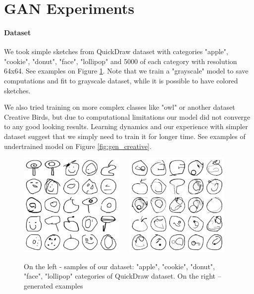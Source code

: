 \documentclass{article}
\begin{document}
\section{GAN Experiments}
	\paragraph{Dataset}
	We took simple sketches from QuickDraw dataset with categories "apple", "cookie", "donut", "face", "lollipop" and 5000 of each category with resolution 64x64. See examples on Figure \ref{fig:dataset}. Note that we train a "grayscale" model to save computations and fit to grayscale dataset, while it is possible to have colored sketches.
	
	We also tried training on more complex classes like "owl" or another dataset Creative Birds, but due to computational limitations our model did not converge to any good looking results. Learning dynamics and our experience with simpler dataset suggest that we simply need to train it for longer time. See examples of undertrained model on Figure \ref{fig:gen_creative}.
	
	 \begin{figure}[h]
	 	\centering
	 	\includegraphics[width=0.45\textwidth]{img/data.png}
	 	\hspace{4mm}
	 	\unskip\ \vrule\
	 	\hspace{4mm}
	 	\includegraphics[width=0.45\textwidth]{img/gen.png}
	 	\caption{On the left - samples of our dataset: "apple", "cookie", "donut", "face", "lollipop" categories of QuickDraw dataset. On the right -- generated examples}
	 	\label{fig:dataset}
	 \end{figure}
	
\end{document}
